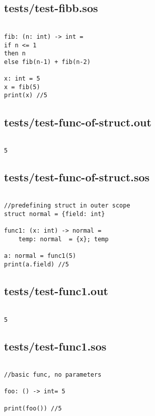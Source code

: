 \documentclass[main.tex]{subfiles}
\begin{document}
\subsection{tests/test-fibb.sos}

\begin{lstlisting}

fib: (n: int) -> int = 
if n <= 1
then n
else fib(n-1) + fib(n-2)

x: int = 5
x = fib(5)
print(x) //5
\end{lstlisting}

\subsection{tests/test-func-of-struct.out}

\begin{lstlisting}

5
\end{lstlisting}

\subsection{tests/test-func-of-struct.sos}

\begin{lstlisting}

//predefining struct in outer scope
struct normal = {field: int}

func1: (x: int) -> normal = 
    temp: normal  = {x}; temp

a: normal = func1(5)
print(a.field) //5
\end{lstlisting}

\subsection{tests/test-func1.out}

\begin{lstlisting}

5
\end{lstlisting}

\subsection{tests/test-func1.sos}

\begin{lstlisting}

//basic func, no parameters

foo: () -> int= 5

print(foo()) //5
\end{lstlisting}
\end{document}
